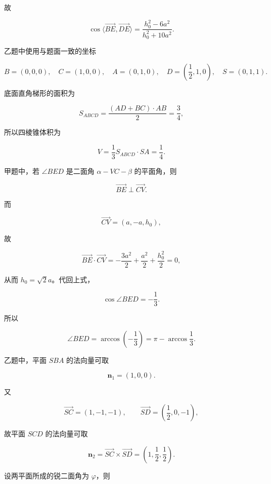 \begin{answer}
故

\nopagebreak[4]
\[
\cos\langle\overrightarrow{BE},\overrightarrow{DE}\rangle
=\frac{h_0^2-6a^2}{h_0^2+10a^2}.
\]

乙题中使用与题面一致的坐标

\nopagebreak[4]
\[
B=(0,0,0),\quad C=(1,0,0),\quad A=(0,1,0),\quad
D=\left(\frac12,1,0\right),\quad S=(0,1,1).
\]

底面直角梯形的面积为

\nopagebreak[4]
\[
S_{ABCD}=\frac{(AD+BC)\cdot AB}{2}
=\frac34,
\]

所以四棱锥体积为

\nopagebreak[4]
\[
V=\frac13S_{ABCD}\cdot SA=\frac14.
\]


甲题中，若 $\angle BED$ 是二面角 $\alpha-VC-\beta$ 的平面角，则

\nopagebreak[4]
\[
\overrightarrow{BE}\perp\overrightarrow{CV}.
\]

而

\nopagebreak[4]
\[
\overrightarrow{CV}=(a,-a,h_0),
\]

故

\nopagebreak[4]
\[
\overrightarrow{BE}\cdot\overrightarrow{CV}
=-\frac{3a^2}{2}+\frac{a^2}{2}+\frac{h_0^2}{2}=0,
\]

从而 $h_0=\sqrt2a$。代回上式，

\nopagebreak[4]
\[
\cos\angle BED=-\frac13.
\]

所以

\nopagebreak[4]
\[
\angle BED=\arccos\left(-\frac13\right)
=\pi-\arccos\frac13.
\]

乙题中，平面 $SBA$ 的法向量可取

\nopagebreak[4]
\[
\boldsymbol n_1=(1,0,0).
\]

又

\nopagebreak[4]
\[
\overrightarrow{SC}=(1,-1,-1),\qquad
\overrightarrow{SD}=\left(\frac12,0,-1\right),
\]

故平面 $SCD$ 的法向量可取

\nopagebreak[4]
\[
\boldsymbol n_2=\overrightarrow{SC}\times\overrightarrow{SD}
=\left(1,\frac12,\frac12\right).
\]

设两平面所成的锐二面角为 $\varphi$，则


\end{answer}
